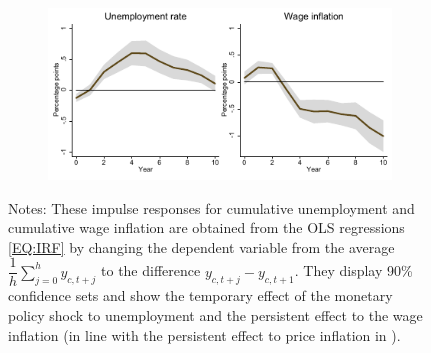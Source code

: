 \documentclass[12pt]{article}
\newcommand{\annote}[1]{\parbox{\textwidth}{\renewcommand{\baselinestretch}{1.0}\vspace{12pt} \footnotesize Notes: #1}}
\begin{document}
\begin{appendices}
\begin{figure}[h!]
    \centering
    \caption{Impulse Responses of Cumulative Changes in Unemployment and Wage Inflation}
	\label{F:Non_Avg_Response}
	\begin{subfigure}[b]{0.75\textwidth}
		\includegraphics[width=\textwidth]{../Output/Figures/fig_full_LPIV10_2.pdf}
	\end{subfigure}
\annote{These impulse responses for cumulative unemployment and cumulative wage inflation are obtained from the OLS regressions \eqref{EQ:IRF} by changing the dependent variable from the average $\dfrac{1}{h} \sum^h_{j=0} y_{c,t+j}$ to the difference $y_{c,t+j}-y_{c,t+1}$. They display 90\% confidence sets and show the temporary effect of the monetary policy shock to unemployment and the persistent effect to the wage inflation (in line with the persistent effect to price inflation in \cite{Jorda2019}).}
\end{figure}


\end{appendices}
\end{document}
